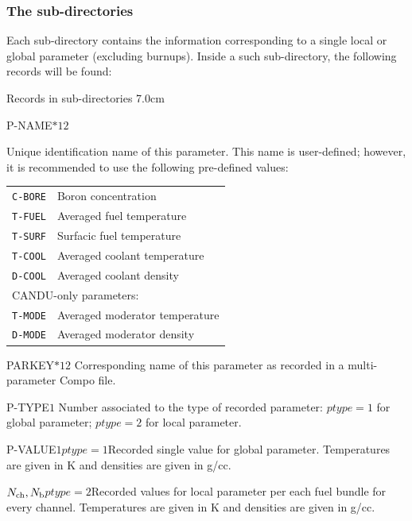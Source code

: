 \clearpage

\subsubsection{The  sub-directories}\label{sect:dirparam}

Each  sub-directory contains the information corresponding
to a single local or global parameter (excluding  burnups). Inside a such sub-directory,
the following records will be found:

\begin{DescriptionEnregistrement}{Records in  sub-directories}
{7.0cm} \label{tabl:tabparam}

\CharEnr
 {P-NAME}{$*12$} {Unique identification name of this parameter. This
 name is user-defined; however, it is recommended to use the following pre-defined
 values:

\begin{tabular}{|c|l|}
\hline
{\tt C-BORE} & Boron concentration \\
{\tt T-FUEL} & Averaged fuel temperature \\
{\tt T-SURF} & Surfacic fuel temperature \\
{\tt T-COOL} & Averaged coolant temperature \\
{\tt D-COOL} & Averaged coolant density \\
\hline
\multicolumn{2}{|l|}{CANDU-only parameters:} \\
\hline
{\tt T-MODE} & Averaged moderator temperature\\
{\tt D-MODE} & Averaged moderator density \\
\hline
\end{tabular}
 }

\CharEnr
 {PARKEY}{$*12$} {Corresponding name of this parameter as recorded
  in a multi-parameter Compo file.}

\IntEnr
 {P-TYPE}{$1$} {Number associated to the type of recorded parameter:
 $ptype=1$ for global parameter; $ptype=2$ for local parameter.}

\OptRealEnr
 {P-VALUE}{$1$}{$ptype=1$}{}{Recorded single value for global parameter. Temperatures are given in K and densities are given in g/cc.}

\OptRealEnr
  {}{$N_{\rm ch}, N_{\rm b}$}{$ptype=2$}{}{Recorded values for local parameter per each fuel
  bundle for every channel. Temperatures are given in K and densities are given in g/cc.}

\end{DescriptionEnregistrement}

